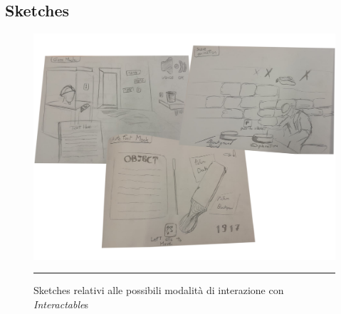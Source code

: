 \documentclass[10pt, openany]{article}
\begin{document}
  \subsection{Sketches}
  \begin{figure}[h]
    \centering
    \begin{mdframed}[
      linecolor=black,
      linewidth=1pt,
      innertopmargin=6pt,
      innerbottommargin=6pt,
      innerleftmargin=6pt,
      innerrightmargin=6pt
    ]
    \includegraphics[width=\textwidth]{sketches.png}
    \vspace{3pt}
    \hrule
    \vspace{3pt}
    \caption{Sketches relativi alle possibili modalit\`a di interazione con \textit{Interactable}s}
    \end{mdframed}
  \end{figure}
  \FloatBarrier
\end{document}

